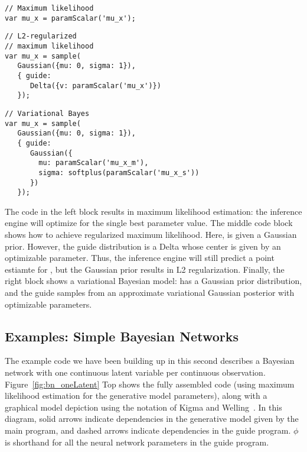\begin{minipage}{0.33\linewidth}
\begin{lstlisting}[style=learnableModels]
// Maximum likelihood
var mu_x = paramScalar('mu_x');
\end{lstlisting}
\end{minipage}
%
\hspace{-2em}
%
\begin{minipage}{0.33\linewidth}
\begin{lstlisting}[style=learnableModels]
// L2-regularized
// maximum likelihood
var mu_x = sample(
   Gaussian({mu: 0, sigma: 1}),
   { guide:
      Delta({v: paramScalar('mu_x')})
   });
\end{lstlisting}
\end{minipage}
%
\hspace{-1em}
%
\begin{minipage}{0.33\linewidth}
\begin{lstlisting}[style=learnableModels]
// Variational Bayes
var mu_x = sample(
   Gaussian({mu: 0, sigma: 1}),
   { guide:
      Gaussian({
        mu: paramScalar('mu_x_m'),
        sigma: softplus(paramScalar('mu_x_s'))
      })
   });
\end{lstlisting}
\end{minipage}

The code in the left block results in maximum likelihood estimation: the inference engine will optimize for the single best parameter value.
The middle code block shows how to achieve regularized maximum likelihood. Here,  is given a Gaussian prior. However, the guide distribution is a Delta whose center is given by an optimizable parameter. Thus, the inference engine will still predict a point estiamte for , but the Gaussian prior results in L2 regularization.
Finally, the right block shows a variational Bayesian model:  has a Gaussian prior distribution, and the guide samples  from an approximate variational Gaussian posterior with optimizable parameters.


\subsection{Examples: Simple Bayesian Networks}

The example code we have been building up in this second describes a Bayesian network with one continuous latent variable per continuous observation. Figure~\ref{fig:bn_oneLatent} Top shows the fully assembled code (using maximum likelihood estimation for the generative model parameters), along with a graphical model depiction using the notation of Kigma and Welling~\cite{AEVB}. In this diagram, solid arrows indicate dependencies in the generative model given by the main program, and dashed arrows indicate dependencies in the guide program. $\phi$ is shorthand for all the neural network parameters in the guide program.

